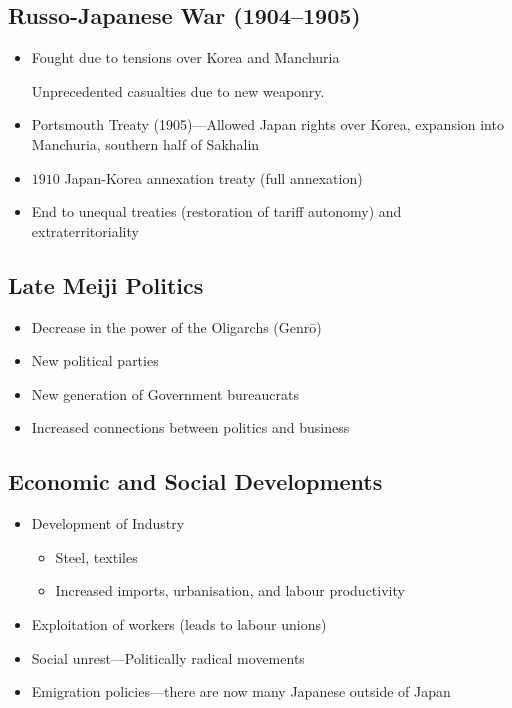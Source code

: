 \documentclass[class=article, crop=false]{standalone}
\begin{document}
  \subsection{Russo-Japanese War (1904--1905)}
  \begin{itemize}
    \item Fought due to tensions over Korea and Manchuria
    \begin{note}{}
      Unprecedented casualties due to new weaponry.
    \end{note}
    \item Portsmouth Treaty (1905)---Allowed Japan rights over Korea, expansion into Manchuria, southern half of Sakhalin 
    \item $1910$ Japan-Korea annexation treaty (full annexation)
    \item End to unequal treaties (restoration of tariff autonomy) and extraterritoriality
  \end{itemize}
  \subsection{Late Meiji Politics}
  \begin{itemize}
    \item Decrease in the power of the Oligarchs (Genr\=o)
    \item New political parties
    \item New generation of Government bureaucrats
    \item Increased connections between politics and business
  \end{itemize}
  \subsection{Economic and Social Developments}
  \begin{itemize}
    \item Development of Industry
    \begin{itemize}
      \item Steel, textiles
      \item Increased imports, urbanisation, and labour productivity
    \end{itemize}
    \item Exploitation of workers (leads to labour unions) 
    \item Social unrest---Politically radical movements
    \item Emigration policies---there are now many Japanese outside of Japan
  \end{itemize}
\end{document}

